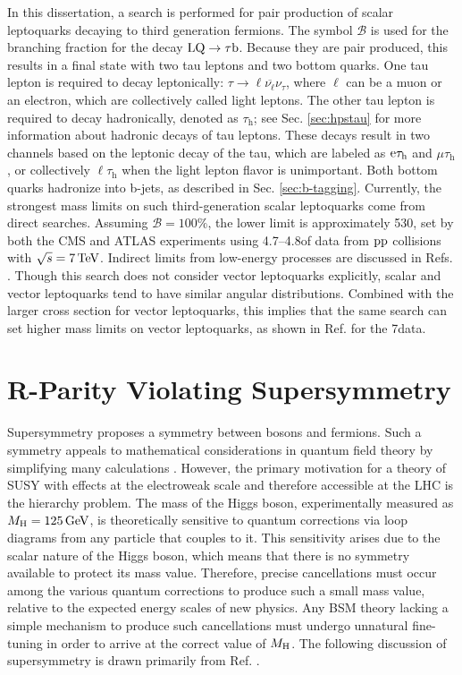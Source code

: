 \documentclass[12pt]{thesis}  %
\newcommand{\tauh}{\ensuremath{\tau_{\text{h}}}\xspace}
\newcommand{\Pe}{\ensuremath{\cmsSymbolFace{e}}\xspace}
\newcommand{\Pp}{\ensuremath{\cmsSymbolFace{p}}\xspace}
\newcommand{\mutau}{\ensuremath{\mu\tauh}\xspace}
\newcommand{\etau}{\ensuremath{\Pe\tauh}\xspace}
\newcommand{\ltau}{\ensuremath{\ell\tauh}\xspace}
\begin{document}
In this dissertation, a search is performed for pair production of scalar leptoquarks decaying to third generation fermions. The symbol $\mathcal{B}$ is used for the branching fraction for the decay $\text{LQ} \rightarrow \tau \mathrm{b}$. Because they are pair produced, this results in a final state with two tau leptons and two bottom quarks. One tau lepton is required to decay leptonically: $\tau \rightarrow \ell \overline{\nu_{\ell}} \nu_{\tau}$, where $\ell$ can be a muon or an electron, which are collectively called light leptons. The other tau lepton is required to decay hadronically, denoted as \tauh; see Sec. \ref{sec:hpstau} for more information about hadronic decays of tau leptons. These decays result in two channels based on the leptonic decay of the tau, which are labeled as \etau and \mutau, or collectively \ltau when the light lepton flavor is unimportant. Both bottom quarks hadronize into b-jets, as described in Sec. \ref{sec:b-tagging}. Currently, the strongest mass limits on such third-generation scalar leptoquarks come from direct searches. Assuming $\mathcal{B}=100\%$, the lower limit is approximately 530\GeV, set by both the CMS \cite{CMSLQ3} and ATLAS \cite{ATLASLQ3} experiments using 4.7--4.8\fbinv of data from $\Pp\Pp$ collisions with $\sqrt{s}=7\,\text{Te\hspace{-.08em}V}$. Indirect limits from low-energy processes are discussed in Refs. \cite{ModelIndLQ,Leurer:1993em, MuchAdo, LQreview}. Though this search does not consider vector leptoquarks explicitly, scalar and vector leptoquarks tend to have similar angular distributions. Combined with the larger cross section for vector leptoquarks, this implies that the same search can set higher mass limits on vector leptoquarks, as shown in Ref. \cite{CMSLQ3} for the 7\TeV data.


\section{R-Parity Violating Supersymmetry
\label{sec:RPVSUSY}}

Supersymmetry proposes a symmetry between bosons and fermions. Such a symmetry appeals to mathematical considerations in quantum field theory by simplifying many calculations \cite{Peskin}. However, the primary motivation for a theory of SUSY with effects at the electroweak scale and therefore accessible at the LHC is the hierarchy problem. The mass of the Higgs boson, experimentally measured as $M_{\mathrm{H}} = 125\,\text{Ge\hspace{-.08em}V}$, is theoretically sensitive to quantum corrections via loop diagrams from any particle that couples to it. This sensitivity arises due to the scalar nature of the Higgs boson, which means that there is no symmetry available to protect its mass value. Therefore, precise cancellations must occur among the various quantum corrections to produce such a small mass value, relative to the expected energy scales of new physics. Any BSM theory lacking a simple mechanism to produce such cancellations must undergo unnatural fine-tuning in order to arrive at the correct value of $M_{\mathrm{H}}$. The following discussion of supersymmetry is drawn primarily from Ref. \cite{Primer}.
\end{document}
